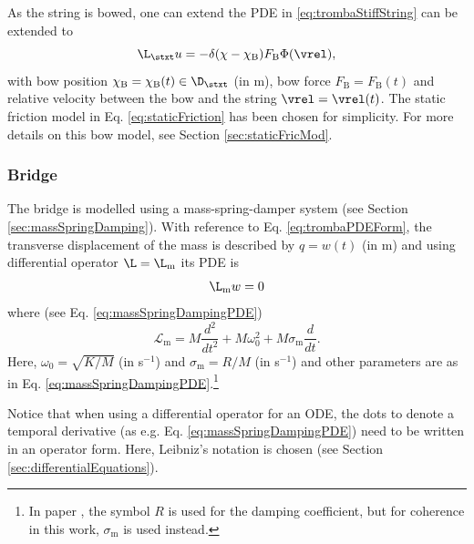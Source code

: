 As the string is bowed, one can extend the PDE in \eqref{eq:trombaStiffString} can be extended to 
\begin{equation}
    \L_\stxt u =  - \delta(\chi-\chi_\text{B})F_\text{B}\Phi(\vrel),
\end{equation}
with bow position $\chi_\text{B} = \chi_\text{B}(t) \in \D_\stxt$ (in m), bow force $F_\text{B} = F_\text{B}(t)$ and relative velocity between the bow and the string $\vrel=\vrel(t)$. The static friction model in Eq. \eqref{eq:staticFriction} has been chosen for simplicity. For more details on this bow model, see Section \ref{sec:staticFricMod}.

\subsubsection{Bridge}
The bridge is modelled using a mass-spring-damper system (see Section \ref{sec:massSpringDamping}). With reference to Eq. \eqref{eq:trombaPDEForm}, the transverse displacement of the mass is described by $q = w(t)$ (in m) and using differential operator $\L = \L_\text{m}$ its PDE is 
\begin{equation}
    \L_\text{m} w = 0
\end{equation}
where (see Eq. \eqref{eq:massSpringDampingPDE})
\begin{equation*}
    \mathcal{L}_\text{m}=M\frac{d^2}{dt^2}+M\omega_0^2+M\sigma_\text{m}\frac{d}{dt}.
\end{equation*}
Here, $\omega_0 = \sqrt{K/M}$ (in s$^{-1}$) and $\sigma_\text{m} = R/M$ (in s$^{-1}$) and other parameters are as in Eq. \eqref{eq:massSpringDampingPDE}.\footnote{In paper \citeP[D], the symbol $R$ is used for the damping coefficient, but for coherence in this work, $\sigma_\text{m}$ is used instead.} 

Notice that when using a differential operator for an ODE, the dots to denote a temporal derivative (as e.g. Eq. \eqref{eq:massSpringDampingPDE}) need to be written in an operator form. Here, Leibniz's notation is chosen (see Section \ref{sec:differentialEquations}). 



